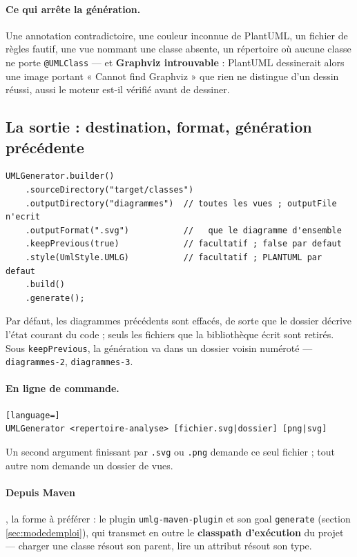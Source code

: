 \documentclass[12pt, a4paper]{article}
\begin{document}
\paragraph{Ce qui arrête la génération.} Une annotation contradictoire, une couleur inconnue de PlantUML, un fichier de règles fautif, une vue nommant une classe absente, un répertoire où aucune classe ne porte \texttt{@UMLClass} --- et \textbf{Graphviz introuvable} : PlantUML dessinerait alors une image portant « Cannot find Graphviz » que rien ne distingue d'un dessin réussi, aussi le moteur est-il vérifié avant de dessiner.

\subsection{La sortie : destination, format, génération précédente}
\label{sec:sortie}
\begin{lstlisting}
UMLGenerator.builder()
    .sourceDirectory("target/classes")
    .outputDirectory("diagrammes")  // toutes les vues ; outputFile n'ecrit
    .outputFormat(".svg")           //   que le diagramme d'ensemble
    .keepPrevious(true)             // facultatif ; false par defaut
    .style(UmlStyle.UMLG)           // facultatif ; PLANTUML par defaut
    .build()
    .generate();
\end{lstlisting}
Par défaut, les diagrammes précédents sont effacés, de sorte que le dossier décrive l'état courant du code ; seuls les fichiers que la bibliothèque écrit sont retirés. Sous \texttt{keepPrevious}, la génération va dans un dossier voisin numéroté --- \texttt{diagrammes-2}, \texttt{diagrammes-3}.

\paragraph{En ligne de commande.}
\begin{lstlisting}[language=]
UMLGenerator <repertoire-analyse> [fichier.svg|dossier] [png|svg]
\end{lstlisting}
Un second argument finissant par \texttt{.svg} ou \texttt{.png} demande ce seul fichier ; tout autre nom demande un dossier de vues.

\paragraph{Depuis Maven}, la forme à préférer : le plugin \texttt{umlg-maven-plugin} et son goal \texttt{generate} (section \ref{sec:modedemploi}), qui transmet en outre le \textbf{classpath d'exécution} du projet --- charger une classe résout son parent, lire un attribut résout son type.
\end{document}
